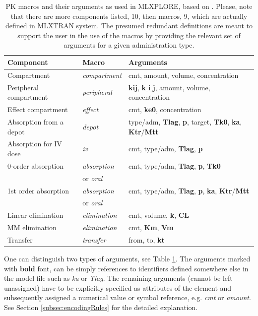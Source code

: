 \begin{table}[ht!]
\begin{center}
\begin{tabular}{lll}
  \hline
  \hline
Component & Macro & Arguments \\
  \hline
Compartment 			& \textit{compartment}	 	& cmt, amount, volume, concentration \\
Peripheral compartment	& \textit{peripheral}			& \textbf{kij}, \textbf{k$\_$i$\_$j}, amount, volume, concentration \\
Effect compartment 		& \textit{effect} 				& cmt, \textbf{ke0}, concentration \\
Absorption from a depot 	& \textit{depot} 				& type/adm, \textbf{Tlag}, \textbf{p}, target, \textbf{Tk0}, \textbf{ka}, \textbf{Ktr}/\textbf{Mtt} \\
Absorption for IV dose 	& \textit{iv} 				& cmt, type/adm, \textbf{Tlag}, \textbf{p} \\
0-order absorption 		& \textit{absorption}			& cmt, type/adm, \textbf{Tlag}, \textbf{p}, \textbf{Tk0} \\[-.5ex]
					& or \textit{oral}				& \\
1st order absorption 	& \textit{absorption}			& cmt, type/adm, \textbf{Tlag}, \textbf{p}, \textbf{ka}, \textbf{Ktr}/\textbf{Mtt} \\[-.5ex]
					& or \textit{oral}				& \\
Linear elimination 		& \textit{elimination}			& cmt, volume, \textbf{k}, \textbf{CL} \\
MM elimination 		& \textit{elimination}			& cmt, \textbf{Km}, \textbf{Vm} \\
Transfer 				& \textit{transfer}			& from, to, \textbf{kt} \\
  \hline
\end{tabular}
\caption{PK macros and their arguments as used in MLXPLORE, based on 
\cite{MLXTRANforMonolix:2014}. Please, note that there are more components listed, 
10, then macros, 9, which are actually defined in MLXTRAN system. The presumed 
redundant definitions are meant to support the user in the use of the macros by 
providing the relevant set of arguments for a given administration type.}
\label{tab:MLXPLORElibrary}
\end{center}
\end{table}
One can distinguish two types of arguments, see Table \ref{tab:MLXPLORElibrary}. 
The arguments marked with \textbf{bold} font, can be simply references to identifiers 
defined somewhere else in the model file such as \emph{ka} or \emph{Tlag}. The remaining 
arguments (cannot be left unassigned) have to be explicitly specified as attributes 
of the  element and subsequently assigned a numerical value or 
symbol reference, e.g. \emph{cmt} or \emph{amount}. See Section 
\ref{subsec:encodingRules} for the detailed explanation.

